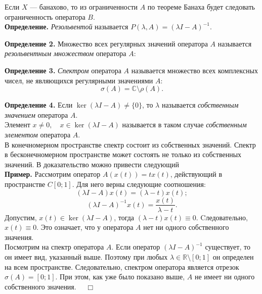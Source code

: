\documentclass[12pt,a4paper, titlepage]{article}
\renewcommand{\Im}{\mathop{\mathrm{Im}}\nolimits}
\begin{document}
Если $X$ --- банахово, то из ограниченности $A$ по теореме Банаха будет следовать ограниченность оператора $B$.\\

\textbf{Определение.} \textit{Резольвентой} называется $P(\lambda, A) = (\lambda I - A)^{-1}$.

\textbf{Определение 2.} Множество всех регулярных значений оператора $A$ называется \textit{резольвентным множеством} оператора $A$:

\textbf{Определение 3.} \textit{Спектром} оператора $A$ называется множество всех комплексных чисел, не являющихся регулярными значениями $A$:
$$
\sigma (A) = \mathbb{C} \setminus \rho (A).
$$


\textbf{Определение 4.} Если $\ker (\lambda I - A) \neq \{0\}$, то $\lambda$ называется \textit{собственным значением} оператора $A$.\\

Элемент $x \neq 0, \quad x \in \ker (\lambda I - A)$ называется в таком случае \textit{собственным элементом} оператора $A$.\\

В конечномерном пространстве спектр состоит из собственных значений.
Спектр в бесконечномерном пространстве может состоять не только из собственных значений. В доказательство можно привести следующий\\
\textbf{Пример.} Рассмотрим оператор $A(x(t)) = tx(t)$, действующий в пространстве $C[0;1]$. Для него верны следующие соотношения:
$$
(\lambda I - A) x(t) = (\lambda - t) x(t);
$$
$$
(\lambda I - A)^{-1} x(t) = \frac{x(t)}{\lambda - t}.
$$
Допустим, $x(t) \in \ker (\lambda I - A)$, тогда $(\lambda - t)x(t) \equiv 0$. Cледовательно, $x(t) \equiv 0$. Это означает, что у оператора $A$ нет ни одного собственного значения.\\

Посмотрим на спектр оператора $A$. Если оператор $(\lambda I - A)^{-1}$ существует, то он имеет вид, указанный выше. Поэтому при любых $\lambda \in \mathbb{R} \setminus [0;1]$ он определен на всем пространстве. Следовательно, спектром оператора является отрезок $\sigma (A) = [0; 1]$. При этом, как уже было показано выше, $A$ не имеет ни одного собственного значения. $\quad \Box$\\
\end{document}
